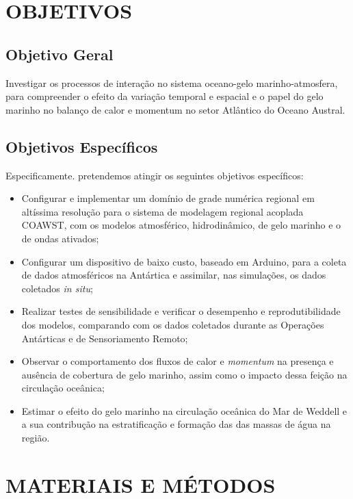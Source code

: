 \documentclass{article}
\begin{document}
\section{OBJETIVOS}
\bigskip

\subsection{Objetivo Geral}
\bigskip

Investigar os processos de interação no sistema oceano-gelo marinho-atmosfera, para compreender o efeito  
da variação temporal e espacial e o papel do gelo marinho no balanço de calor e momentum no setor Atlântico do Oceano Austral.

\subsection{Objetivos Específicos}
\bigskip

Especificamente. pretendemos atingir os seguintes objetivos específicos:

\begin{itemize}
	\item Configurar e implementar um domínio de grade numérica regional em altíssima resolução para o sistema de
	modelagem regional acoplada COAWST, com os modelos atmosférico, hidrodinâmico, de gelo marinho e o de ondas ativados;
	\item Configurar um dispositivo de baixo custo, baseado em Arduino, para a coleta de dados atmosféricos na Antártica e assimilar, 
	nas simulações, os dados coletados \textit{in situ};
	\item Realizar testes de sensibilidade e verificar o desempenho e reprodutibilidade dos modelos, comparando com
	os dados coletados durante as Operações Antárticas e de Sensoriamento Remoto;
	\item Observar o comportamento dos fluxos de calor e \textit{momentum} na presença e ausência de cobertura de gelo marinho, assim como 
	o impacto dessa feição na circulação oceânica;
	\item Estimar o efeito do gelo marinho na circulação oceânica do Mar de Weddell e a sua contribução na estratificação e formação das
	 das massas de água na região.
\end{itemize}

\section{MATERIAIS E MÉTODOS}
\bigskip
\end{document}

